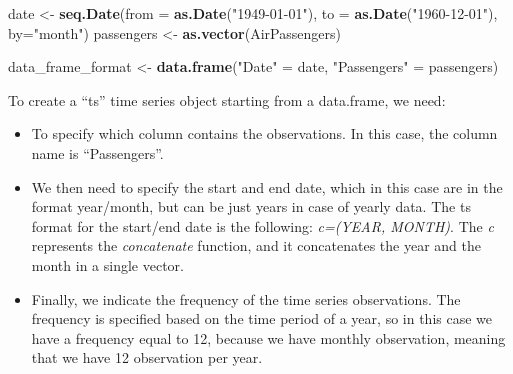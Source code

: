 \documentclass[
]{article}
\newenvironment{Shaded}{\begin{snugshade}}{\end{snugshade}}
\newcommand{\DataTypeTok}[1]{\textcolor[rgb]{0.13,0.29,0.53}{#1}}
\newcommand{\DecValTok}[1]{\textcolor[rgb]{0.00,0.00,0.81}{#1}}
\newcommand{\KeywordTok}[1]{\textcolor[rgb]{0.13,0.29,0.53}{\textbf{#1}}}
\newcommand{\NormalTok}[1]{#1}
\newcommand{\OperatorTok}[1]{\textcolor[rgb]{0.81,0.36,0.00}{\textbf{#1}}}
\newcommand{\StringTok}[1]{\textcolor[rgb]{0.31,0.60,0.02}{#1}}
\providecommand{\tightlist}{%
  \setlength{\itemsep}{0pt}\setlength{\parskip}{0pt}}
\begin{document}
\begin{Shaded}
\begin{Highlighting}[]
\NormalTok{date <-}\StringTok{ }\KeywordTok{seq.Date}\NormalTok{(}\DataTypeTok{from =} \KeywordTok{as.Date}\NormalTok{(}\StringTok{"1949-01-01"}\NormalTok{), }
                 \DataTypeTok{to =} \KeywordTok{as.Date}\NormalTok{(}\StringTok{"1960-12-01"}\NormalTok{), }\DataTypeTok{by=}\StringTok{"month"}\NormalTok{)}
\NormalTok{passengers <-}\StringTok{ }\KeywordTok{as.vector}\NormalTok{(AirPassengers)}

\NormalTok{data_frame_format <-}\StringTok{ }\KeywordTok{data.frame}\NormalTok{(}\StringTok{"Date"}\NormalTok{ =}\StringTok{ }\NormalTok{date, }
                                \StringTok{"Passengers"}\NormalTok{ =}\StringTok{ }\NormalTok{passengers)}
\end{Highlighting}
\end{Shaded}

To create a ``ts'' time series object starting from a data.frame, we need:

\begin{itemize}
\tightlist
\item
  To specify which column contains the observations. In this case, the column name is ``Passengers''.
\item
  We then need to specify the start and end date, which in this case are in the format year/month, but can be just years in case of yearly data. The ts format for the start/end date is the following: \emph{c=(YEAR, MONTH)}. The \emph{c} represents the \emph{concatenate} function, and it concatenates the year and the month in a single vector.
\item
  Finally, we indicate the frequency of the time series observations. The frequency is specified based on the time period of a year, so in this case we have a frequency equal to 12, because we have monthly observation, meaning that we have 12 observation per year.
\end{itemize}

\begin{Shaded}
\end{Shaded}
\end{document}
